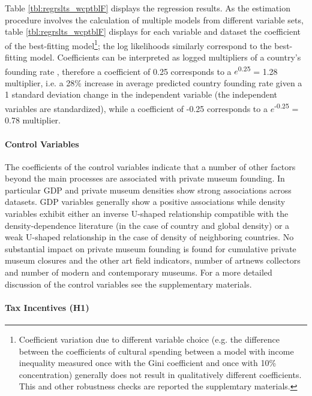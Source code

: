 \documentclass[11pt]{article}
\begin{document}
Table \ref{tbl:regrslts_wcptblF} displays the regression results. 
As the estimation procedure involves the calculation of multiple models from different variable sets, table \ref{tbl:regrslts_wcptblF} displays for each variable and dataset the coefficient of the best-fitting model\footnote{Coefficient variation due to different variable choice (e.g. the difference between the coefficients of cultural spending between a model with income inequality measured once with the Gini coefficient and once with 10\% concentration) generally does not result in qualitatively different coefficients. This and other robustness checks are reported the supplemtary materials.}; the log likelihoods similarly correspond to the best-fitting model. 
Coefficients can be interpreted as logged multipliers of a country's founding rate \parencite{Coxe_West_Aiken_2009_count}, therefore a coefficient of 0.25 corresponds to a \(e\)\textsuperscript{0.25} = 1.28 multiplier, i.e. a 28\% increase in average predicted country founding rate given a 1 standard deviation change in the independent variable (the independent variables are standardized), while a coefficient of -0.25 corresponds to a \(e\)\textsuperscript{-0.25} = 0.78 multiplier.
\FloatBarrier

\paragraph*{Control Variables}

The coefficients of the control variables indicate that a number of other factors beyond the main processes are associated with private museum founding.
In particular GDP and private museum densities show strong associations across datasets.
GDP variables generally show a positive associations while density variables exhibit either an inverse U-shaped relationship compatible with the density-dependence literature (in the case of country and global density) or a weak U-shaped relationship in the case of density of neighboring countries.
No substantial impact on private museum founding is found for cumulative private museum closures and the other art field indicators, number of artnews collectors and number of modern and contemporary museums.
For a more detailed discussion of the control variables see the supplementary materials. 



\paragraph*{Tax Incentives (H1)}
\end{document}
